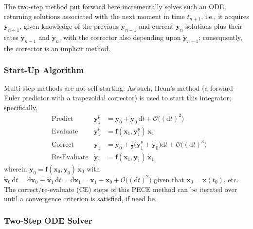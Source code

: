 The two-step method put forward here incrementally solves such an ODE, returning solutions associated with the next moment in time $t_{n+1}$, i.e., it acquires $\mathbf{y}_{n+1}$, given knowledge of the  previous $\mathbf{y}_{n-1}$ and current $\mathbf{y}_n$ solutions plus their rates $\dot{\mathbf{y}}_{n-1}$ and $\dot{\mathbf{y}}_n$, with the corrector also depending upon $\dot{\mathbf{y}}_{n+1}$; consequently, the corrector is an implicit method.

\subsubsection{Start-Up Algorithm}

Multi-step methods are not self starting.  As such, Heun's method (a forward-Euler predictor with a trapezoidal corrector) is used to start this integrator; specifically,
\begin{subequations}
    \label{startUp1stOrderODEs}
    \begin{align}
    \mbox{} & \text{Predict} & 
    \mathbf{y}_1^p & = \mathbf{y}_0 + \dot{\mathbf{y}}_0 \, \mathrm{d}t + 
    \mathcal{O} \bigl( (\mathrm{d}t)^2 \bigr)
    \label{startUp1stOrderPredictor} \\
    \mbox{} & \text{Evaluate} & 
    \dot{\mathbf{y}}^p_1 & = \mathbf{f} (\mathbf{x}_1 , \mathbf{y}_1^p) \, 
    \dot{\mathbf{x}}_1
    \label{startUp1stEvaluate} \\
    \mbox{} & \text{Correct} &
    \mathbf{y}_1 & = \mathbf{y}_0 + \tfrac{1}{2} 
    \bigl( \dot{\mathbf{y}}_1^p + \dot{\mathbf{y}}_0 \bigr) \mathrm{d}t + 
    \mathcal{O} \bigl( (\mathrm{d}t)^3 \bigr)
    \label{startUp1stOrderCorrector} \\
    \mbox{} & \text{Re-Evaluate} & 
    \dot{\mathbf{y}}_1 & = \mathbf{f} (\mathbf{x}_1 , \mathbf{y}_1) \,
    \dot{\mathbf{x}}_1 
    \label{startUp1stReEvaluate}
    \end{align}
\end{subequations}
wherein $\dot{\mathbf{y}}_0 = \mathbf{f}(\mathbf{x}_0, \mathbf{y}_0) \, \dot{\mathbf{x}}_0$ with $\dot{\mathbf{x}}_0 \, \mathrm{d}t = \mathrm{d} \mathbf{x}_0 \equiv \dot{\mathbf{x}}_1 \, \mathrm{d}t = \mathrm{d} \mathbf{x}_1 = \mathbf{x}_1 - \mathbf{x}_0 + \mathcal{O}\bigl( (\mathrm{d}t)^2 \bigr)$ given that $\mathbf{x}_0 = \mathbf{x}(t_0)$, etc.  The correct\slash re-evaluate (CE) steps of this PECE method can be iterated over until a convergence criterion is satisfied, if need be.

\subsubsection{Two-Step ODE Solver}

